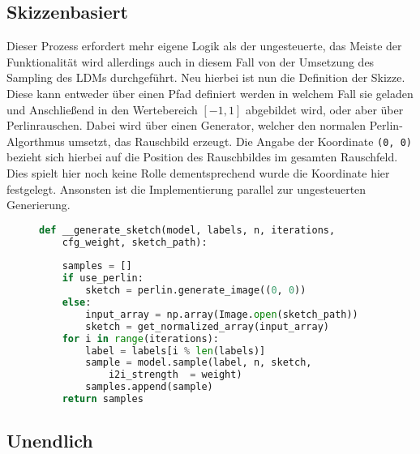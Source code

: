 \subsection {Skizzenbasiert}

Dieser Prozess erfordert mehr eigene Logik als der ungesteuerte, das Meiste der Funktionalität wird allerdings auch in diesem Fall von der Umsetzung des Sampling des LDMs durchgeführt. Neu hierbei ist nun die Definition der Skizze. Diese kann entweder über einen Pfad definiert werden in welchem Fall sie geladen und Anschließend in den Wertebereich $[-1,1]$ abgebildet wird, oder aber über Perlinrauschen. Dabei wird über einen Generator, welcher den normalen Perlin-Algorthmus umsetzt, das Rauschbild erzeugt. Die Angabe der Koordinate \texttt{(0, 0)} bezieht sich hierbei auf die Position des Rauschbildes im gesamten Rauschfeld. Dies spielt hier noch keine Rolle dementsprechend wurde die Koordinate hier festgelegt. Ansonsten ist die Implementierung parallel zur ungesteuerten Generierung.
\begin{figure}[htbp]
\begin{lstlisting}[language=python]
def __generate_sketch(model, labels, n, iterations,
    cfg_weight, sketch_path):
    
    samples = []
    if use_perlin:
        sketch = perlin.generate_image((0, 0))
    else:
        input_array = np.array(Image.open(sketch_path))
        sketch = get_normalized_array(input_array)
    for i in range(iterations):
        label = labels[i % len(labels)]
        sample = model.sample(label, n, sketch,
            i2i_strength  = weight)
        samples.append(sample)
    return samples
\end{lstlisting}
    \captionsetup{type=figure}
    \label{fig:gen_sketch}
\end{figure}

\subsection {Unendlich}

